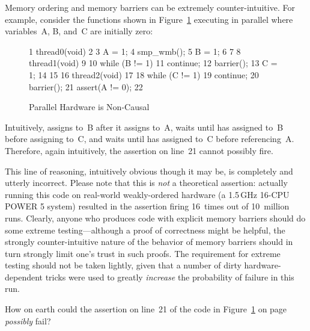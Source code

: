 Memory ordering and memory barriers can be extremely counter-intuitive.
For example, consider the functions shown in
Figure~\ref{fig:advsync:Parallel Hardware is Non-Causal}
executing in parallel
where variables~A, B, and~C are initially zero:

\begin{figure}[htbp]
{ \scriptsize
\begin{verbbox}
  1 thread0(void)
  2 {
  3   A = 1;
  4   smp_wmb();
  5   B = 1;
  6 }
  7
  8 thread1(void)
  9 {
 10   while (B != 1)
 11     continue;
 12   barrier();
 13   C = 1;
 14 }
 15
 16 thread2(void)
 17 {
 18   while (C != 1)
 19     continue;
 20   barrier();
 21   assert(A != 0);
 22 }
\end{verbbox}
}
\centering
\theverbbox
\caption{Parallel Hardware is Non-Causal}
\label{fig:advsync:Parallel Hardware is Non-Causal}
\end{figure}

Intuitively,  assigns to~B after it assigns to~A,
 waits until  has assigned to~B before
assigning to~C, and  waits until  has
assigned to~C before referencing~A.
Therefore, again intuitively, the assertion on line~21 cannot possibly
fire.

This line of reasoning, intuitively obvious though it may be, is completely
and utterly incorrect.
Please note that this is \emph{not} a theoretical assertion:
actually running this code on real-world weakly-ordered hardware
(a 1.5\,GHz 16-CPU POWER 5 system) resulted in the assertion firing
16~times out of 10~million runs.
Clearly, anyone who produces code with explicit memory barriers
should do some extreme testing---although a proof of correctness might
be helpful, the strongly counter-intuitive nature of the behavior of
memory barriers should in turn strongly limit one's trust in such proofs.
The requirement for extreme testing should not be taken lightly, given
that a number of dirty hardware-dependent tricks were used to
greatly \emph{increase} the probability of failure in this run.

\QuickQuiz{}
	How on earth could the assertion on line~21 of the code in
	Figure~\ref{fig:advsync:Parallel Hardware is Non-Causal} on
	page~\pageref{fig:advsync:Parallel Hardware is Non-Causal}
	\emph{possibly} fail?
 \QuickQuizEnd

